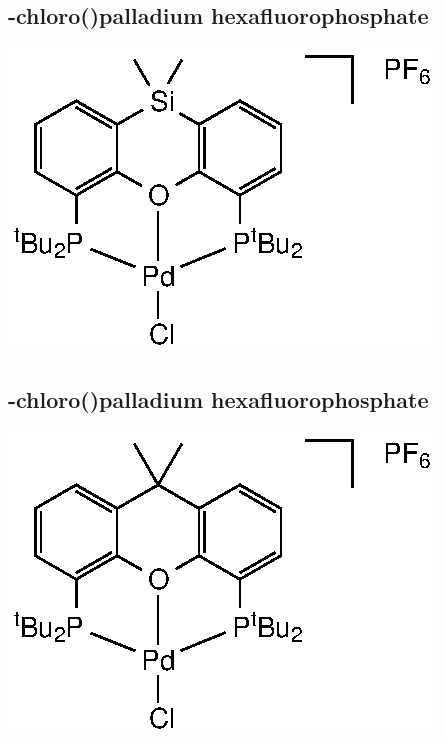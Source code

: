\subsection*{\trans-chloro(\tBuSixantphos)palladium hexafluorophosphate}
\begin{structure}[h]
\begin{center}
\includegraphics{../Structures/SitBuPdClPF6.eps}
\end{center}
\end{structure}

\subsection*{\trans-chloro(\tBuXantphos)palladium hexafluorophosphate}
\begin{structure}[h]
\begin{center}
\includegraphics{../Structures/CtBuPdClPF6.eps}
\end{center}
\end{structure}

